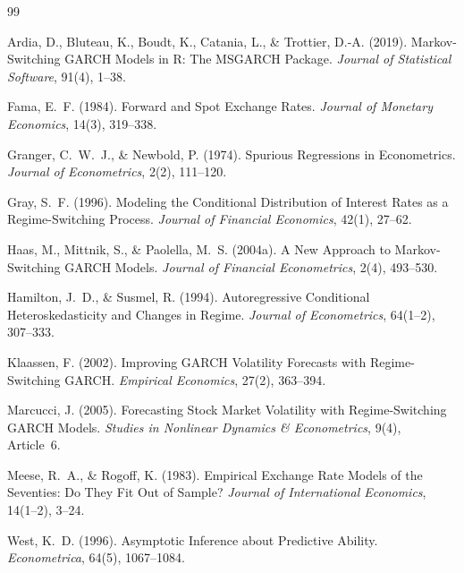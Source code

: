 \documentclass[12pt,a4paper]{article}
\begin{document}
	\begin{thebibliography}{99}
		
		Ardia, D., Bluteau, K., Boudt, K., Catania, L., \& Trottier, D.-A.
		(2019). Markov-Switching GARCH Models in R: The MSGARCH Package.
		\textit{Journal of Statistical Software}, 91(4), 1--38.
		
		Fama, E.~F. (1984). Forward and Spot Exchange Rates.
		\textit{Journal of Monetary Economics}, 14(3), 319--338.
		
		Granger, C.~W.~J., \& Newbold, P. (1974). Spurious Regressions in
		Econometrics. \textit{Journal of Econometrics}, 2(2), 111--120.
		
		Gray, S.~F. (1996). Modeling the Conditional Distribution of Interest
		Rates as a Regime-Switching Process. \textit{Journal of Financial
			Economics}, 42(1), 27--62.
		
		Haas, M., Mittnik, S., \& Paolella, M.~S. (2004a). A New Approach to
		Markov-Switching GARCH Models. \textit{Journal of Financial
			Econometrics}, 2(4), 493--530.
		
		Hamilton, J.~D., \& Susmel, R. (1994). Autoregressive Conditional
		Heteroskedasticity and Changes in Regime. \textit{Journal of
			Econometrics}, 64(1--2), 307--333.
		
		Klaassen, F. (2002). Improving GARCH Volatility Forecasts with
		Regime-Switching GARCH. \textit{Empirical Economics}, 27(2), 363--394.
		
		Marcucci, J. (2005). Forecasting Stock Market Volatility with
		Regime-Switching GARCH Models. \textit{Studies in Nonlinear Dynamics \&
			Econometrics}, 9(4), Article~6.
		
		Meese, R.~A., \& Rogoff, K. (1983). Empirical Exchange Rate Models of
		the Seventies: Do They Fit Out of Sample? \textit{Journal of
			International Economics}, 14(1--2), 3--24.
		
		West, K.~D. (1996). Asymptotic Inference about Predictive Ability.
		\textit{Econometrica}, 64(5), 1067--1084.
		
	\end{thebibliography}
	
	
\end{document}
